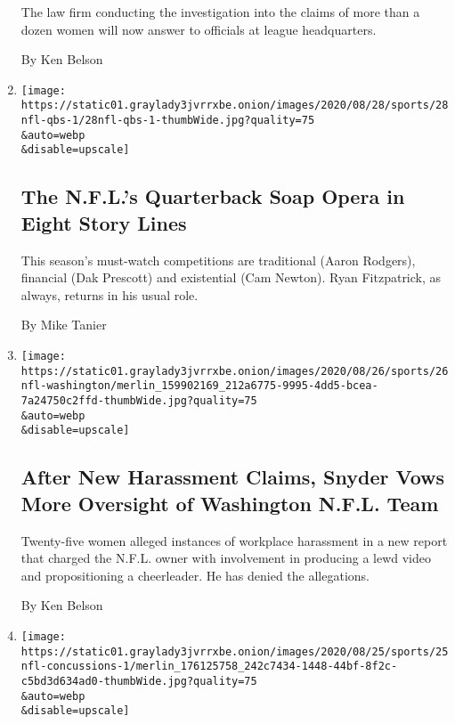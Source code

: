 \begin{enumerate}
  The law firm conducting the investigation into the claims of more than
  a dozen women will now answer to officials at league headquarters.

  By Ken Belson
\item
  \href{/2020/08/31/sports/football/nfl-quarterback-controversies.html}{}

  \texttt{[image: https://static01.graylady3jvrrxbe.onion/images/2020/08/28/sports/28nfl-qbs-1/28nfl-qbs-1-thumbWide.jpg?quality=75\\\&auto=webp\\\&disable=upscale]}

  \hypertarget{the-nfls-quarterback-soap-opera-in-eight-story-lines}{%
  \subsection{The N.F.L.'s Quarterback Soap Opera in Eight Story
  Lines}\label{the-nfls-quarterback-soap-opera-in-eight-story-lines}}

  This season's must-watch competitions are traditional (Aaron Rodgers),
  financial (Dak Prescott) and existential (Cam Newton). Ryan
  Fitzpatrick, as always, returns in his usual role.

  By Mike Tanier
\item
  \href{/2020/08/26/sports/football/dan-snyder-washington-nfl.html}{}

  \texttt{[image: https://static01.graylady3jvrrxbe.onion/images/2020/08/26/sports/26nfl-washington/merlin\_159902169\_212a6775-9995-4dd5-bcea-7a24750c2ffd-thumbWide.jpg?quality=75\\\&auto=webp\\\&disable=upscale]}

  \hypertarget{after-new-harassment-claims-snyder-vows-more-oversight-of-washington-nfl-team}{%
  \subsection{After New Harassment Claims, Snyder Vows More Oversight of
  Washington N.F.L.
  Team}\label{after-new-harassment-claims-snyder-vows-more-oversight-of-washington-nfl-team}}

  Twenty-five women alleged instances of workplace harassment in a new
  report that charged the N.F.L. owner with involvement in producing a
  lewd video and propositioning a cheerleader. He has denied the
  allegations.

  By Ken Belson
\item
  \href{/2020/08/25/sports/football/nfl-concussion-racial-bias.html}{}

  \texttt{[image: https://static01.graylady3jvrrxbe.onion/images/2020/08/25/sports/25nfl-concussions-1/merlin\_176125758\_242c7434-1448-44bf-8f2c-c5bd3d634ad0-thumbWide.jpg?quality=75\\\&auto=webp\\\&disable=upscale]}


\end{enumerate}
